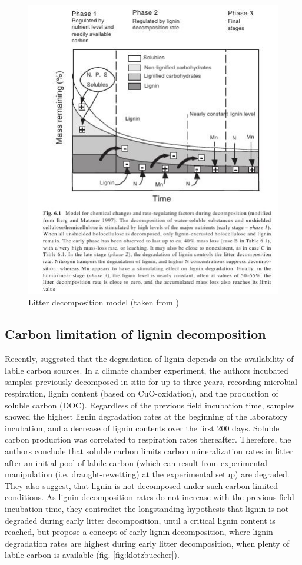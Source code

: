 \begin{figure} 
\begin{center} 
\includegraphics{decompositionmodel_berg.jpg}
\caption{Litter decomposition model (taken from \cite{Berg2008})} 
\label{fig:berg}
\end{center} 
\end{figure}  

\subsection{Carbon limitation of lignin decomposition}

Recently, \cite{Klotzbucher2011} suggested that the degradation of lignin depends on the availability of labile carbon sources. In a climate chamber experiment, the authors incubated samples previously decomposed in-sitio for up to three years, recording microbial respiration, lignin content (based on CuO-oxidation), and the production of soluble carbon (DOC). Regardless of the previous field incubation time, samples showed the highest lignin degradation rates at the beginning of the laboratory incubation, and a decrease of lignin contents over the first 200 days. Soluble carbon production was correlated to respiration rates thereafter. Therefore, the authors conclude that soluble carbon limits carbon mineralization rates in litter after an initial pool of labile carbon (which can result from experimental manipulation (i.e. draught-rewetting) at the experimental setup) are degraded. They also suggest, that lignin is not decomposed under such carbon-limited conditions. As lignin decomposition rates do not increase with the previous field incubation time, they contradict the longstanding hypothesis that lignin is not degraded during early litter decomposition, until a critical lignin content is reached, but propose a concept of early lignin decomposition, where lignin degradation rates are highest during early litter decomposition, when plenty of labile carbon is available (fig. \ref{fig:klotzbuecher}).


